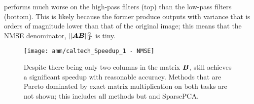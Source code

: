 \oursp performs much worse on the high-pass filters (top) than the low-pass filters (bottom). This is likely because the former produce outputs with variance that is orders of magnitude lower than that of the original image; this means that the NMSE denominator, $\lVert\bm{A}\bm{B}\rVert^2_F$ is tiny.  %

\begin{figure}[h]
\begin{center}
\texttt{[image: amm/caltech\_Speedup\_1 - NMSE]}
\vspace*{.25mm}
\caption{Despite there being only two columns in the matrix $\bm{B}$, \oursp still achieves a significant speedup with reasonable accuracy. Methods that are Pareto dominated by exact matrix multiplication on both tasks are not shown; this includes all methods but \oursp and SparsePCA.} %
\label{fig:caltech}
\end{center}
\end{figure}


